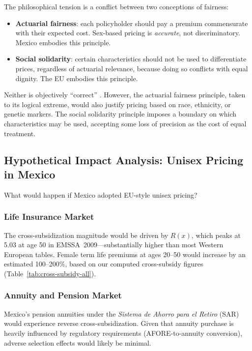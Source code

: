 \documentclass[12pt,a4paper]{article}
\begin{document}
The philosophical tension is a conflict between two conceptions of fairness:
\begin{itemize}
  \item \textbf{Actuarial fairness}: each policyholder should pay a premium commensurate with their expected cost. Sex-based pricing is \emph{accurate}, not discriminatory. Mexico embodies this principle.
  \item \textbf{Social solidarity}: certain characteristics should not be used to differentiate prices, regardless of actuarial relevance, because doing so conflicts with equal dignity. The EU embodies this principle.
\end{itemize}

Neither is objectively ``correct'' \cite{thiery2006}. However, the actuarial fairness principle, taken to its logical extreme, would also justify pricing based on race, ethnicity, or genetic markers. The social solidarity principle imposes a boundary on which characteristics may be used, accepting some loss of precision as the cost of equal treatment.

\subsection{Hypothetical Impact Analysis: Unisex Pricing in Mexico}
\label{subsec:hypothetical}

What would happen if Mexico adopted EU-style unisex pricing?

\subsubsection{Life Insurance Market}

The cross-subsidization magnitude would be driven by $R(x)$, which peaks at 5.03 at age 50 in EMSSA~2009---substantially higher than most Western European tables. Female term life premiums at ages 20--50 would increase by an estimated 100--200\%, based on our computed cross-subsidy figures (Table~\ref{tab:cross-subsidy-all}).

\subsubsection{Annuity and Pension Market}

Mexico's pension annuities under the \emph{Sistema de Ahorro para el Retiro} (SAR) would experience reverse cross-subsidization. Given that annuity purchase is heavily influenced by regulatory requirements (AFORE-to-annuity conversion), adverse selection effects would likely be minimal.
\end{document}
